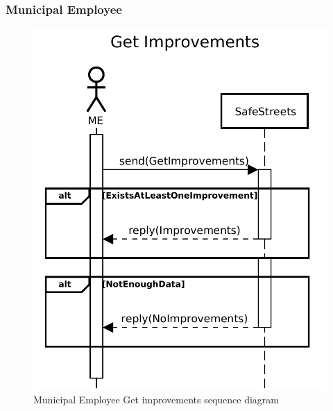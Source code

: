 					\subsubsection{Municipal Employee}
						\begin{figure}[!h]
								\centering
							\includegraphics[height=0.5\textheight] {images/SequenceDiagram/Authority/ME/GetImprovements.pdf}
								\caption{Municipal Employee Get improvements sequence diagram}
						\end{figure}
					\clearpage
